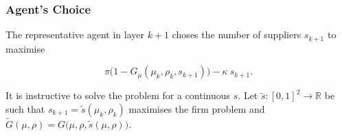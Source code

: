 \documentclass[american, abstract=on]{scrartcl}
\theoremstyle{plain}
\renewcommand{\Re}{\mathbb{R}}
\begin{document}
\subsubsection{Agent's Choice}

The representative agent in layer $k + 1$ choses the number of suppliers $s_{k+1}$ to maximise

\begin{equation}
  \pi \Big(1 - G_{\mu}(\mu_k, \rho_k, s_{k+1})\Big) - \kappa \  s_{k + 1}.
\end{equation}

It is instructive to solve the problem for a continuous $s$. Let $\tilde{s}: [0, 1]^2 \to \Re$ be such that $s_{k + 1} = \tilde{s}(\mu_k, \rho_k)$ maximises the firm problem and $\tilde{G}(\mu, \rho) = G\big(\mu, \rho, \tilde{s}(\mu, \rho)\big)$.



\newpage
\nocite{*}
\printbibliography

\newpage
\appendix

\end{document}
